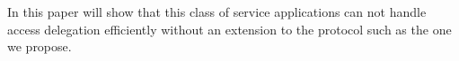 \documentclass[a4paper]{llncs}
\begin{document}
In this paper will show that this class of service applications can not handle access delegation efficiently without an extension to the protocol such as the one we propose.






\end{document}
